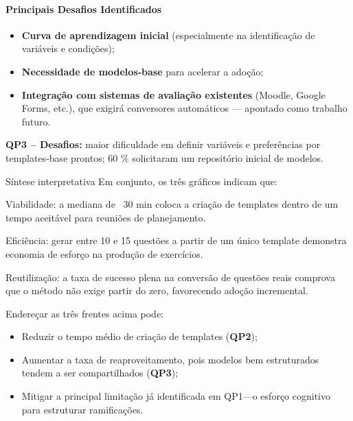 \paragraph{\textbf{Principais Desafios Identificados}}

\begin{itemize}
    \item \textbf{Curva de aprendizagem inicial} (especialmente na identificação de variáveis e condições);
    \item \textbf{Necessidade de modelos‐base} para acelerar a adoção;
    \item \textbf{Integração com sistemas de avaliação existentes} (Moodle, Google Forms, etc.), que exigirá conversores automáticos — apontado como trabalho futuro.
\end{itemize}
\textbf{QP3 – Desafios:} maior dificuldade em definir variáveis e preferências por templates‐base prontos; 60 \% solicitaram um repositório inicial de modelos. 


Síntese interpretativa
Em conjunto, os três gráficos indicam que:

Viabilidade: a mediana de ~30 min coloca a criação de templates dentro de um tempo aceitável para reuniões de planejamento.

Eficiência: gerar entre 10 e 15 questões a partir de um único template demonstra economia de esforço na produção de exercícios.

Reutilização: a taxa de sucesso plena na conversão de questões reais comprova que o método não exige partir do zero, favorecendo adoção incremental.


Endereçar as três frentes acima pode:

\begin{itemize}
    \item Reduzir o tempo médio de criação de templates (\textbf{QP2});
    \item Aumentar a taxa de reaproveitamento, pois modelos bem estruturados tendem a ser compartilhados (\textbf{QP3});
    \item Mitigar a principal limitação já identificada em QP1—o esforço cognitivo para estruturar ramificações.
\end{itemize}

